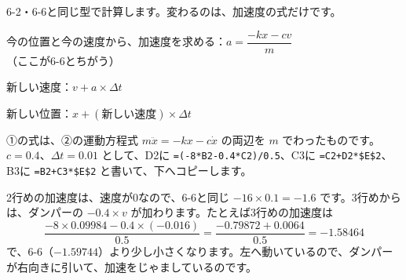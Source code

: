 \label{bk:6-7:hyou}6-2・6-6と同じ型で計算します。変わるのは、加速度の式だけです。
\begin{enumerate}[label={\bkcircled[\bkTF]{\arabic*}}, leftmargin=2.4\zw, itemsep=1pt, topsep=2pt]
\item 今の位置と今の速度から、加速度を求める：$a=\dfrac{-kx-cv}{m}$（ここが6-6とちがう）
\item 新しい速度：$v+a\times\Delta t$
\item 新しい位置：$x+(\text{新しい速度})\times\Delta t$
\end{enumerate}
①の式は、②の運動方程式 $m\ddot x=-kx-c\dot x$ の両辺を $m$ でわったものです。
$c=0.4$、$\Delta t=0.01$ として、D2に \texttt{=(-8*B2-0.4*C2)/0.5}、C3に \texttt{=C2+D2*\$E\$2}、B3に \texttt{=B2+C3*\$E\$2} と書いて、下へコピーします。
\begin{bkcenter}
\end{bkcenter}
2行めの加速度は、速度が0なので、6-6と同じ $-16\times0.1=-1.6$ です。3行めからは、ダンパーの $-0.4\times v$ が加わります。たとえば3行めの加速度は
\[ \frac{-8\times0.09984-0.4\times(-0.016)}{0.5}=\frac{-0.79872+0.0064}{0.5}=-1.58464 \]
で、6-6（$-1.59744$）より少し小さくなります。左へ動いているので、ダンパーが右向きに引いて、加速をじゃましているのです。

